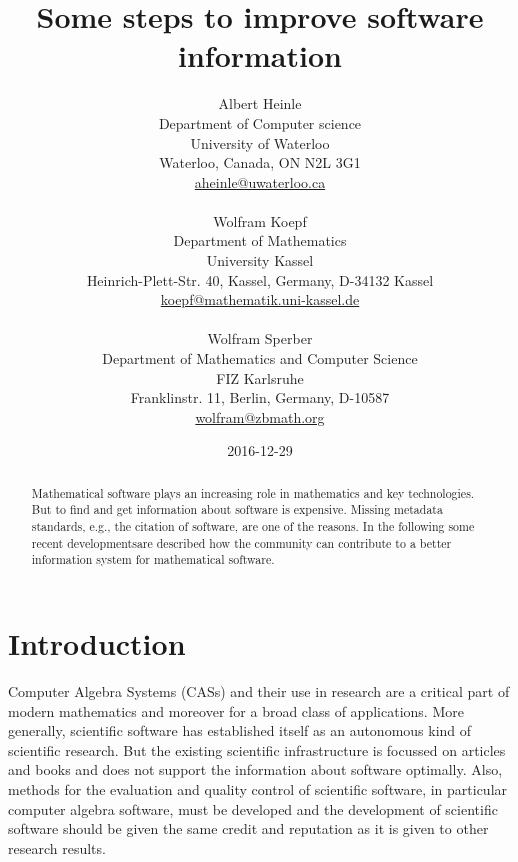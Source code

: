 \documentclass[12pt]{article}
\begin{document}
\title{Some steps to improve software information}

\author{Albert Heinle\\
  Department of Computer science\\
  University of Waterloo\\
  Waterloo, Canada,  ON N2L 3G1\\
  \url{aheinle@uwaterloo.ca}\\
  \\
  Wolfram Koepf\\
  Department of Mathematics\\
  University Kassel\\
  Heinrich-Plett-Str. 40, Kassel, Germany, D-34132 Kassel\\
  \url{koepf@mathematik.uni-kassel.de}\\
  \\
  Wolfram Sperber\\
  Department of Mathematics and Computer Science\\
  FIZ Karlsruhe\\
  Franklinstr. 11, Berlin, Germany, D-10587\\
  \url{wolfram@zbmath.org}}    

\date{2016-12-29}

\maketitle


\begin{abstract}
  Mathematical software plays an increasing role in mathematics and key
  technologies. But to find and get information about software is
  expensive. Missing metadata standards, e.g., the citation of software, are
  one of the reasons. In the following some recent developmentsare described
  how the community can contribute to a better information system for
  mathematical software.
\end{abstract}

\section{Introduction}

Computer Algebra Systems (CASs) and their use in research are a critical part
of modern mathematics and more\-over for a broad class of applications. More
generally, scientific software has established itself as an autonomous kind of
scientific research. But the existing scientific infrastructure is focussed on
articles and books and does not support the information about software
optimally. Also, methods for the evaluation and quality control of scientific
software, in particular computer algebra software, must be developed and the
development of scientific software should be given the same credit and
reputation as it is given to other research results.
\end{document}
